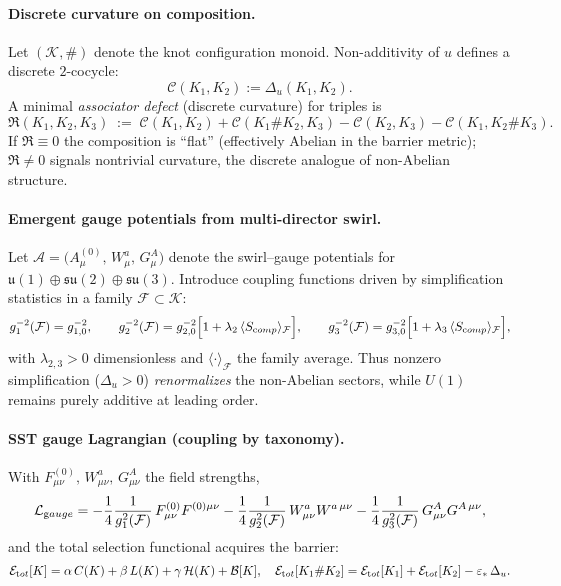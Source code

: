 \documentclass[11pt]{article}
\begin{document}
\paragraph{Discrete curvature on composition.}
    Let \((\mathcal K,\#)\) denote the knot configuration monoid. Non-additivity of \(u\) defines a discrete \(2\)-cocycle:
    \[
        \mathcal C(K_1,K_2):=\Delta_u(K_1,K_2).
    \]
    A minimal \emph{associator defect} (discrete curvature) for triples is
    \[
        \mathfrak{R}(K_1,K_2,K_3)\;:=\;
        \mathcal C(K_1,K_2)+\mathcal C(K_1\#K_2,K_3)
        -\mathcal C(K_2,K_3)-\mathcal C(K_1,K_2\#K_3).
    \]
    If \(\mathfrak{R}\equiv 0\) the composition is “flat” (effectively Abelian in the barrier metric); \(\mathfrak{R}\neq 0\) signals nontrivial curvature, the discrete analogue of non-Abelian structure.

\paragraph{Emergent gauge potentials from multi-director swirl.}
    Let \(\mathcal A=\big(A_\mu^{(0)},\,W_\mu^a,\,G_\mu^A\big)\) denote the swirl–gauge potentials for
    \(\mathfrak u(1)\oplus\mathfrak{su}(2)\oplus\mathfrak{su}(3)\).
    Introduce coupling functions driven by simplification statistics in a family \(\mathcal F\subset\mathcal K\):
    \[
        g_1^{-2}(\mathcal F)=g_{1,0}^{-2},\qquad
        g_2^{-2}(\mathcal F)=g_{2,0}^{-2}\Bigl[1+\lambda_2\,\langle S_{\textrm comp}\rangle_{\mathcal F}\Bigr],
        \qquad
        g_3^{-2}(\mathcal F)=g_{3,0}^{-2}\Bigl[1+\lambda_3\,\langle S_{\textrm comp}\rangle_{\mathcal F}\Bigr],
    \]
    with \(\lambda_{2,3}>0\) dimensionless and \(\langle\cdot\rangle_{\mathcal F}\) the family average.
    Thus nonzero simplification (\(\Delta_u>0\)) \emph{renormalizes} the non-Abelian sectors, while \(U(1)\) remains purely additive at leading order.

\paragraph{SST gauge Lagrangian (coupling by taxonomy).}
    With \(F_{\mu\nu}^{(0)},\,W_{\mu\nu}^a,\,G_{\mu\nu}^A\) the field strengths,
    \[
        \mathcal L_{\textrm gauge}
        =-\frac{1}{4}\frac{1}{g_1^2(\mathcal F)}\,F_{\mu\nu}^{(0)}F^{(0)\mu\nu}
        -\frac{1}{4}\frac{1}{g_2^2(\mathcal F)}\,W_{\mu\nu}^{a}W^{a\,\mu\nu}
        -\frac{1}{4}\frac{1}{g_3^2(\mathcal F)}\,G_{\mu\nu}^{A}G^{A\,\mu\nu},
    \]
    and the total selection functional acquires the barrier:
    \[
        \mathcal E_{\textrm tot}[K]=\alpha\,C(K)+\beta\,L(K)+\gamma\,\mathcal H(K)+\mathcal B[K],
        \quad
        \mathcal E_{\textrm tot}[K_1\#K_2]
        =\mathcal E_{\textrm tot}[K_1]+\mathcal E_{\textrm tot}[K_2]-\varepsilon_*\,\Delta_u.
    \]
\end{document}
